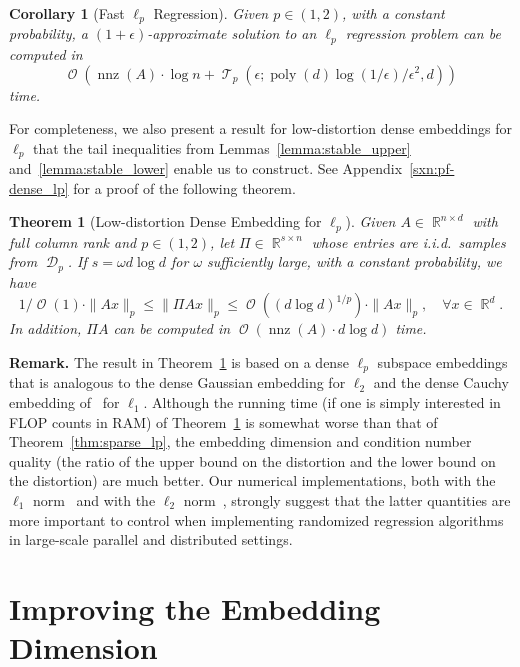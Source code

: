 \documentclass[11pt]{article}
\newtheorem{theorem}{Theorem}
\newtheorem{corollary}{Corollary}
\DeclareMathOperator{\poly}{poly}
\DeclareMathOperator{\bigO}{\mathcal{O}}
\DeclareMathOperator{\nnz}{nnz}
\DeclareMathOperator{\R}{\mathbb{R}}
\DeclareMathOperator{\T}{\mathcal{T}}
\DeclareMathOperator{\D}{\mathcal{D}}
\begin{document}
\begin{corollary}[Fast $\ell_p$ Regression]
  Given $p \in (1, 2)$, with a constant probability, a
  $(1+\epsilon)$-approximate solution to an $\ell_p$ regression problem can be
  computed in
  $$
  \bigO(\nnz(A) \cdot \log n + \T_p(\epsilon; \poly(d) \log(1/\epsilon) / \epsilon^2, d))
  $$
  time.
\end{corollary}





For completeness, we also present a result for low-distortion dense 
embeddings for $\ell_p$ that the tail inequalities from 
Lemmas~\ref{lemma:stable_upper} and~\ref{lemma:stable_lower} enable us to 
construct.
See Appendix~\ref{sxn:pf-dense_lp} for a proof of the following theorem.

\begin{theorem}[Low-distortion Dense Embedding for $\ell_p$]
  \label{thm:dense_lp}
  Given $A \in \R^{n \times d}$ with full column rank and $p \in (1, 2)$, let
  $\Pi \in \R^{s \times n}$ whose entries are i.i.d.\ samples from
  $\D_p$.
  If $s = \omega d \log d$ for $\omega$ sufficiently large, with a constant
  probability, we have
  \begin{equation*}
    1/\bigO(1) \cdot \|A x\|_p \leq \|\Pi A x\|_p \leq \bigO((d \log d)^{1/p}) \cdot \|A x\|_p, \quad \forall x \in \R^d.
  \end{equation*}
  In addition, $\Pi A$ can be computed in 
  $\bigO(\nnz(A) \cdot d \log d)$ time.
\end{theorem}

\noindent
\textbf{Remark.}
The result in Theorem~\ref{thm:dense_lp} is based on a dense $\ell_p$ subspace
embeddings that is analogous to the dense Gaussian embedding for $\ell_2$ and
the dense Cauchy embedding of~\cite{SW11} for $\ell_1$.
Although the running time (if one is simply interested in FLOP counts in RAM) of
Theorem~\ref{thm:dense_lp} is somewhat worse than that of
Theorem~\ref{thm:sparse_lp}, the embedding dimension and condition number
quality (the ratio of the upper bound on the distortion and the lower bound on
the distortion) are much better.
Our numerical implementations, both with the $\ell_1$ norm~\cite{CDMMMW13_SODA}
and with the $\ell_2$ norm~\cite{MSM11_TR}, strongly suggest that the latter
quantities are more important to control when implementing randomized regression
algorithms in large-scale parallel and distributed settings.


\section{Improving the Embedding Dimension}
\label{sxn:improve} 
\end{document}
